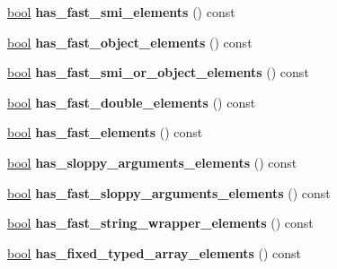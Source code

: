 \begin{DoxyCompactItemize}
\item 
\mbox{\label{classv8_1_1internal_1_1Map_a827f53c315150efe107565e45cf00b68}} 
\mbox{\hyperlink{classbool}{bool}} {\bfseries has\+\_\+fast\+\_\+smi\+\_\+elements} () const
\item 
\mbox{\label{classv8_1_1internal_1_1Map_a57434117bc208002998d4b5f26f97b83}} 
\mbox{\hyperlink{classbool}{bool}} {\bfseries has\+\_\+fast\+\_\+object\+\_\+elements} () const
\item 
\mbox{\label{classv8_1_1internal_1_1Map_aa6bb15988aabf2a5ccc8bd76041b5abf}} 
\mbox{\hyperlink{classbool}{bool}} {\bfseries has\+\_\+fast\+\_\+smi\+\_\+or\+\_\+object\+\_\+elements} () const
\item 
\mbox{\label{classv8_1_1internal_1_1Map_a499518d9638013c7cab3f00bfd931d6d}} 
\mbox{\hyperlink{classbool}{bool}} {\bfseries has\+\_\+fast\+\_\+double\+\_\+elements} () const
\item 
\mbox{\label{classv8_1_1internal_1_1Map_ae41a081661ef3dabd85f6f276c9db3b0}} 
\mbox{\hyperlink{classbool}{bool}} {\bfseries has\+\_\+fast\+\_\+elements} () const
\item 
\mbox{\label{classv8_1_1internal_1_1Map_a9cb75f39672db08f4a89f567b3b62e62}} 
\mbox{\hyperlink{classbool}{bool}} {\bfseries has\+\_\+sloppy\+\_\+arguments\+\_\+elements} () const
\item 
\mbox{\label{classv8_1_1internal_1_1Map_ab3bbab2b5809bcc77fa08c6b7bb13e25}} 
\mbox{\hyperlink{classbool}{bool}} {\bfseries has\+\_\+fast\+\_\+sloppy\+\_\+arguments\+\_\+elements} () const
\item 
\mbox{\label{classv8_1_1internal_1_1Map_af3e3fe10dc50284364d5f65444941033}} 
\mbox{\hyperlink{classbool}{bool}} {\bfseries has\+\_\+fast\+\_\+string\+\_\+wrapper\+\_\+elements} () const
\item 
\mbox{\label{classv8_1_1internal_1_1Map_aff48bd19b601389439023f4fb33594fe}} 
\mbox{\hyperlink{classbool}{bool}} {\bfseries has\+\_\+fixed\+\_\+typed\+\_\+array\+\_\+elements} () const

\end{DoxyCompactItemize}
